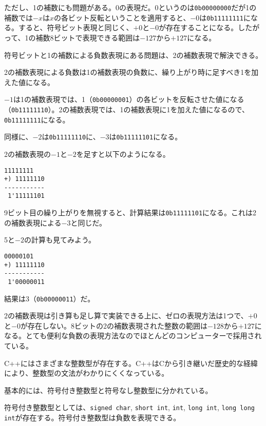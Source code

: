 ただし、1の補数にも問題がある。0の表現だ。0というのは\texttt{0b00000000}だが1の補数では\(-x\)は\(x\)の各ビット反転ということを適用すると、\(-0\)は\texttt{0b11111111}になる。すると、符号ビット表現と同じく、\(+0\)と\(-0\)が存在することになる。したがって、1の補数8ビットで表現できる範囲は\(-127\)から\(+127\)になる。


符号ビットと1の補数による負数表現にある問題は、2の補数表現で解決できる。

2の補数表現による負数は1の補数表現の負数に、繰り上がり時に足すべき1を加えた値になる。

\(-1\)は1の補数表現では、1（\texttt{0b00000001}）の各ビットを反転させた値になる（\texttt{0b11111110}）。2の補数表現では、1の補数表現に1を加えた値になるので、\texttt{0b11111111}になる。

同様に、\(-2\)は\texttt{0b11111110}に、\(-3\)は\texttt{0b11111101}になる。

2の補数表現の\(-1\)と\(-2\)を足すと以下のようになる。

\begin{lstlisting}[style=terminal]
   11111111
+) 11111110
-----------
 1'11111101
\end{lstlisting}

9ビット目の繰り上がりを無視すると、計算結果は\texttt{0b11111101}になる。これは2の補数表現による\(-3\)と同じだ。

5と\(-2\)の計算も見てみよう。

\ifTombow\pagebreak\fi
\begin{lstlisting}[style=terminal]
   00000101
+) 11111110
-----------
 1'00000011
\end{lstlisting}

結果は3（\texttt{0b00000011}）だ。

2の補数表現は引き算も足し算で実装できる上に、ゼロの表現方法は1つで、\(+0\)と\(-0\)が存在しない。8ビットの2の補数表現された整数の範囲は\(-128\)から\(+127\)になる。とても便利な負数の表現方法なのでほとんどのコンピューターで採用されている。


C++にはさまざまな整数型が存在する。C++はCから引き継いだ歴史的な経緯により、整数型の文法がわかりにくくなっている。

基本的には、符号付き整数型と符号なし整数型に分かれている。

符号付き整数型としては、\texttt{signed char}, \texttt{short int}, \texttt{int}, \texttt{long int}, \texttt{long long int}が存在する。符号付き整数型は負数を表現できる。

